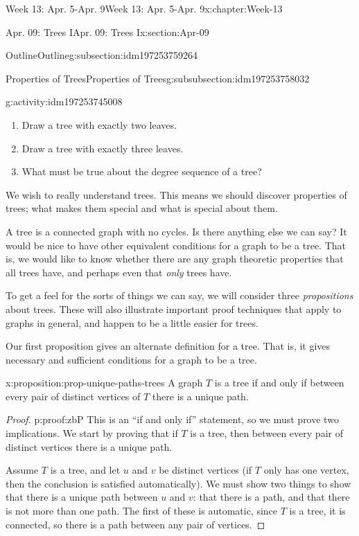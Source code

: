 \documentclass[oneside,10pt,]{book}
\numberwithin{equation}{section}
\begin{document}
\begin{chapterptx}{Week 13: Apr. 5-Apr. 9}{}{Week 13: Apr. 5-Apr. 9}{}{}{x:chapter:Week-13}
\begin{sectionptx}{Apr. 09: Trees I}{}{Apr. 09: Trees I}{}{}{x:section:Apr-09}
\begin{subsectionptx}{Outline}{}{Outline}{}{}{g:subsection:idm197253759264}
\begin{subsubsectionptx}{Properties of Trees}{}{Properties of Trees}{}{}{g:subsubsection:idm197253758032}
\begin{activity}{}{g:activity:idm197253745008}
\begin{enumerate}
\item{}Draw a tree with exactly two leaves.%
\item{}Draw a tree with exactly three leaves.%
\item{}What must be true about the degree sequence of a tree?%
\end{enumerate}
\end{activity}%
We wish to really understand trees. This means we should discover properties of trees; what makes them special and what is special about them.%
\par
A tree is a connected graph with no cycles. Is there anything else we can say? It would be nice to have other equivalent conditions for a graph to be a tree. That is, we would like to know whether there are any graph theoretic properties that all trees have, and perhaps even that \emph{only} trees have.%
\par
To get a feel for the sorts of things we can say, we will consider three \emph{propositions} about trees.  These will also illustrate important proof techniques that apply to graphs in general, and happen to be a little easier for trees.%
\par
Our first proposition gives an alternate definition for a tree.  That is, it gives necessary and sufficient conditions for a graph to be a tree.%
\begin{proposition}{}{}{x:proposition:prop-unique-paths-trees}%
A graph \(T\) is a tree if and only if between every pair of distinct vertices of \(T\) there is a unique path.%
\end{proposition}
\begin{proof}{}{p:proof:zbP}
This is an ``if and only if'' statement, so we must prove two implications.  We start by proving that if \(T\) is a tree, then between every pair of distinct vertices there is a unique path.%
\par
Assume \(T\) is a tree, and let \(u\) and \(v\) be distinct vertices (if \(T\) only has one vertex, then the conclusion is satisfied automatically).  We must show two things to show that there is a unique path between \(u\) and \(v\): that there is a path, and that there is not more than one path.  The first of these is automatic, since \(T\) is a tree, it is connected, so there is a path between any pair of vertices.%
\par

\end{proof}
\end{subsubsectionptx}
\end{subsectionptx}
\end{sectionptx}
\end{chapterptx}
\end{document}
